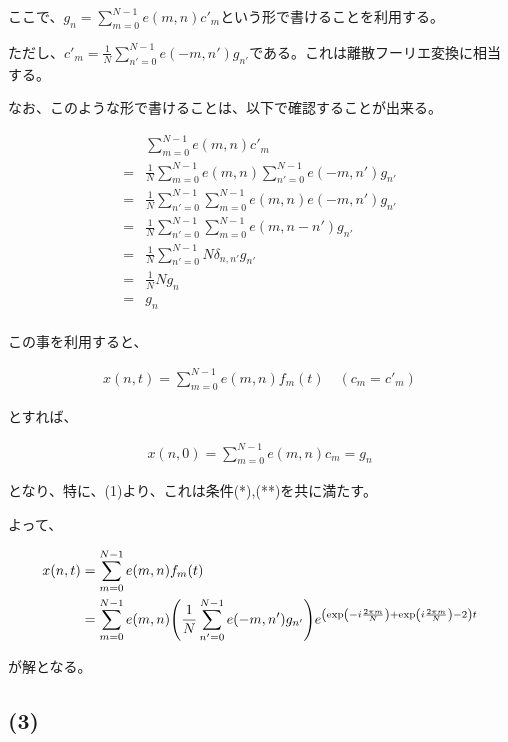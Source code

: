 \documentclass[a4paper, 10pt, dvipdfmx]{jlreq}
\begin{document}
ここで、$g_n=\sum_{m=0}^{N-1}e(m,n)c'_m$という形で書けることを利用する。

ただし、$c'_m=\frac{1}{N}\sum_{n'=0}^{N-1}e(-m,n')g_{n'}$である。これは離散フーリエ変換に相当する。

なお、このような形で書けることは、以下で確認することが出来る。

\begin{align*}
    & \sum_{m=0}^{N-1}e(m,n)c'_m                                       \\
  = & \frac{1}{N}\sum_{m=0}^{N-1}e(m,n)\sum_{n'=0}^{N-1}e(-m,n')g_{n'} \\
  = & \frac{1}{N}\sum_{n'=0}^{N-1}\sum_{m=0}^{N-1}e(m,n)e(-m,n')g_{n'} \\
  = & \frac{1}{N}\sum_{n'=0}^{N-1}\sum_{m=0}^{N-1}e(m,n-n')g_{n'}      \\
  = & \frac{1}{N}\sum_{n'=0}^{N-1}N\delta_{n,n'}g_{n'}                 \\
  = & \frac{1}{N}Ng_n                                                  \\
  = & g_n                                                              \\
\end{align*}

この事を利用すると、

\begin{align*}
  x(n,t)=\sum_{m=0}^{N-1}e(m,n)f_m(t) \quad (c_m=c'_m)
\end{align*}

とすれば、

\begin{align*}
  x(n,0)=\sum_{m=0}^{N-1}e(m,n)c_m=g_n
\end{align*}

となり、特に、(1)より、これは条件(*),(**)を共に満たす。

よって、

\begin{align*}
  x(n,t) & =\sum_{m=0}^{N-1}e(m,n)f_m(t)                                                                                                        \\
         & =\sum_{m=0}^{N-1}e(m,n)\qty(\frac{1}{N}\sum_{n'=0}^{N-1}e(-m,n')g_{n'})e^{\qty(\exp(-i\frac{2\pi m}{N})+\exp(i\frac{2\pi m}{N})-2)t} \\
\end{align*}

が解となる。

\subsection*{(3)}
\end{document}
